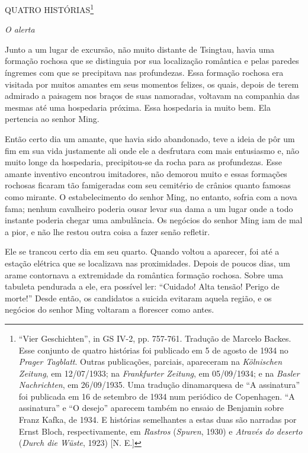 QUATRO HISTÓRIAS\footnote{``Vier Geschichten'', in GS IV-2, pp. 757-761.
  Tradução de Marcelo Backes. Esse conjunto de quatro histórias foi
  publicado em 5 de agosto de 1934 no \emph{Prager Tagblatt}. Outras
  publicações, parciais, apareceram na \emph{Kölnischen Zeitung}, em
  12/07/1933; na \emph{Frankfurter Zeitung}, em 05/09/1934; e na
  \emph{Basler Nachrichten}, em 26/09/1935. Uma tradução dinamarquesa de
  ``A assinatura'' foi publicada em 16 de setembro de 1934 num periódico
  de Copenhagen. ``A assinatura'' e ``O desejo'' aparecem também no
  ensaio de Benjamin sobre Franz Kafka, de 1934. E histórias semelhantes
  a estas duas são narradas por Ernst Bloch, respectivamente, em
  \emph{Rastros} (\emph{Spuren}, 1930) e \emph{Através do deserto}
  (\emph{Durch die Wüste}, 1923) {[}N. E.{]}}

\emph{O alerta }

Junto a um lugar de excursão, não muito distante de Tsingtau, havia uma
formação rochosa que se distinguia por sua localização romântica e pelas
paredes íngremes com que se precipitava nas profundezas. Essa formação
rochosa era visitada por muitos amantes em seus momentos felizes, os
quais, depois de terem admirado a paisagem nos braços de suas namoradas,
voltavam na companhia das mesmas até uma hospedaria próxima. Essa
hospedaria ia muito bem. Ela pertencia ao senhor Ming.

Então certo dia um amante, que havia sido abandonado, teve a ideia de
pôr um fim em sua vida justamente ali onde ele a desfrutara com mais
entusiasmo e, não muito longe da hospedaria, precipitou-se da rocha para
as profundezas. Esse amante inventivo encontrou imitadores, não demorou
muito e essas formações rochosas ficaram tão famigeradas com seu
cemitério de crânios quanto famosas como mirante. O estabelecimento do
senhor Ming, no entanto, sofria com a nova fama; nenhum cavalheiro
poderia ousar levar sua dama a um lugar onde a todo instante poderia
chegar uma ambulância. Os negócios do senhor Ming iam de mal a pior, e
não lhe restou outra coisa a fazer senão refletir.

Ele se trancou certo dia em seu quarto. Quando voltou a aparecer, foi
até a estação elétrica que se localizava nas proximidades. Depois de
poucos dias, um arame contornava a extremidade da romântica formação
rochosa. Sobre uma tabuleta pendurada a ele, era possível ler:
``Cuidado! Alta tensão! Perigo de morte!'' Desde então, os candidatos a
suicida evitaram aquela região, e os negócios do senhor Ming voltaram a
florescer como antes.

